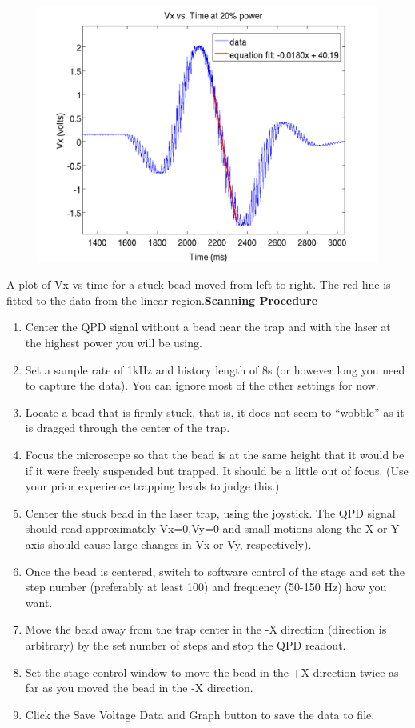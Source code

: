 \documentclass{../lab}
\begin{document}
\begin{figure}[h]
    \centering
    \href{http://experimentationlab.berkeley.edu/sites/default/files/images/StuckBead500.png}{\includegraphics[width=0.5\linewidth]{images/StuckBead500.png}}
    \caption{}
    \label{fig:StuckBead500}
\end{figure}


A plot of Vx vs time for a stuck bead moved from left to right. The red line is fitted to the data from the linear region.\textbf{Scanning Procedure}

\begin{enumerate}
    \item Center the QPD signal without a bead near the trap and with the laser at the highest power you will be using.

    \item Set a sample rate of 1kHz and history length of 8s (or however long you need to capture the data). You can ignore most of the other settings for now.

    \item Locate a bead that is firmly stuck, that is, it does not seem to ``wobble'' as it is dragged through the center of the trap.

    \item Focus the microscope so that the bead is at the same height that it would be if it were freely suspended but trapped. It should be a little out of focus. (Use your prior experience trapping beads to judge this.)

    \item Center the stuck bead in the laser trap, using the joystick. The QPD signal should read approximately Vx=0,Vy=0 and small motions along the X or Y axis should cause large changes in Vx or Vy, respectively).

    \item Once the bead is centered, switch to software control of the stage and set the step number (preferably at least 100) and frequency (50-150 Hz) how you want.

    \item Move the bead away from the trap center in the -X direction (direction is arbitrary) by the set number of steps and stop the QPD readout.

    \item Set the stage control window to move the bead in the +X direction twice as far as you moved the bead in the -X direction.

    \item Click the Save Voltage Data and Graph button to save the data to file.

\end{enumerate}
\end{document}
